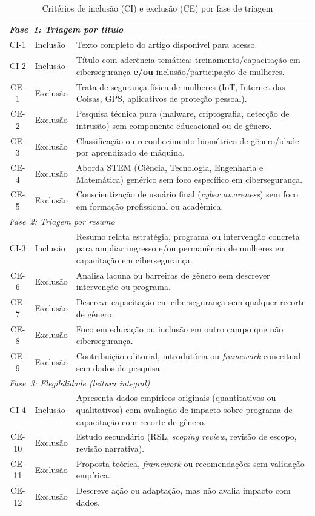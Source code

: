 \documentclass[12pt]{article}
\begin{document}
\begin{table}[H]
\centering
\caption{Critérios de inclusão (CI) e exclusão (CE) por fase de triagem}
\label{tab:criterios}
\small
\begin{tabularx}{\textwidth}{c|l|X}
\midrule
\multicolumn{3}{l}{\textit{Fase~1: Triagem por título}} \\
\midrule
CI-1 & Inclusão & Texto completo do artigo disponível para acesso. \\
CI-2 & Inclusão & Título com aderência temática: treinamento/capa\-citação em cibersegurança \textbf{e/ou} inclusão/participação de mulheres. \\
CE-1 & Exclusão & Trata de segurança física de mulheres (IoT, Internet das Coisas, GPS, aplicativos de proteção pessoal). \\
CE-2 & Exclusão & Pesquisa técnica pura (malware, criptografia, detecção de intrusão) sem componente educacional ou de gênero. \\
CE-3 & Exclusão & Classificação ou reconhecimento biométrico de gênero/idade por aprendizado de máquina. \\
CE-4 & Exclusão & Aborda STEM (Ciência, Tecnologia, Engenharia e Matemática) genérico sem foco específico em cibersegurança. \\
CE-5 & Exclusão & Conscientização de usuário final (\textit{cyber awareness}) sem foco em formação profissional ou acadêmica. \\
\midrule
\multicolumn{3}{l}{\textit{Fase~2: Triagem por resumo}} \\
\midrule
CI-3 & Inclusão & Resumo relata estratégia, programa ou intervenção concreta para ampliar ingresso e/ou permanência de mulheres em capacitação em cibersegurança. \\
CE-6 & Exclusão & Analisa lacuna ou barreiras de gênero sem descrever intervenção ou programa. \\
CE-7 & Exclusão & Descreve capacitação em cibersegurança sem qualquer recorte de gênero. \\
CE-8 & Exclusão & Foco em educação ou inclusão em outro campo que não cibersegurança. \\
CE-9 & Exclusão & Contribuição editorial, introdutória ou \textit{framework} conceitual sem dados de pesquisa. \\
\midrule
\multicolumn{3}{l}{\textit{Fase~3: Elegibilidade (leitura integral)}} \\
\midrule
CI-4 & Inclusão & Apresenta dados empíricos originais (quantitativos ou qualitativos) com avaliação de impacto sobre programa de capacitação com recorte de gênero. \\
CE-10 & Exclusão & Estudo secundário (RSL, \textit{scoping review}, revisão de escopo, revisão narrativa). \\
CE-11 & Exclusão & Proposta teórica, \textit{framework} ou recomendações sem validação empírica. \\
CE-12 & Exclusão & Descreve ação ou adaptação, mas não avalia impacto com dados. \\
\bottomrule
\end{tabularx}
\end{table}
\end{document}
